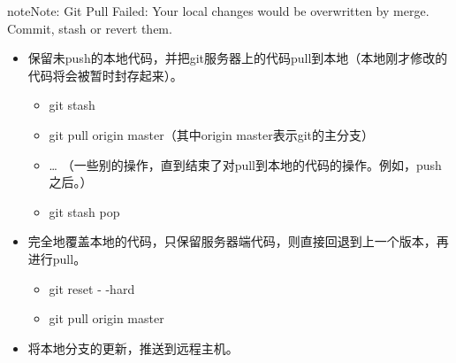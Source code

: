 \documentclass[letterpaper,10pt,english]{sphinxmanual}
\begin{document}
\begin{sphinxadmonition}{note}{Note:}
Git Pull Failed: Your local changes would be overwritten by merge. Commit, stash or revert them.
\begin{itemize}
\item {} 
保留未push的本地代码，并把git服务器上的代码pull到本地（本地刚才修改的代码将会被暂时封存起来）。
\begin{itemize}
\item {} 
git stash

\item {} 
git pull origin master（其中origin master表示git的主分支）

\item {} 
… （一些别的操作，直到结束了对pull到本地的代码的操作。例如，push之后。）

\item {} 
git stash pop

\end{itemize}

\item {} 
完全地覆盖本地的代码，只保留服务器端代码，则直接回退到上一个版本，再进行pull。
\begin{itemize}
\item {} 
git reset - -hard

\item {} 
git pull origin master

\end{itemize}

\end{itemize}
\end{sphinxadmonition}
\begin{itemize}
\item {} 
 将本地分支的更新，推送到远程主机。

\end{itemize}
\end{document}
